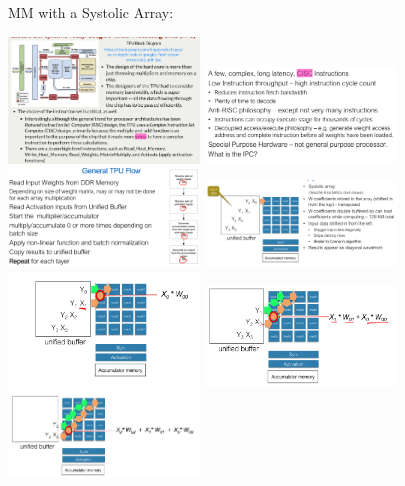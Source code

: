\documentclass[letter,8pt,landscape]{article}
\begin{document}
\begin{multicols}{3}
  MM with a Systolic Array:
  \begin{center}
    \includegraphics[width=2in]{images/tpu-block.jpg}
    \includegraphics[width=2in]{images/tpu-inst.jpg}
    \includegraphics[width=2in]{images/tpu-flow.jpg}
    \includegraphics[width=2in]{images/tpu1.jpg}
    \includegraphics[width=2in]{images/tpu2.jpg}
    \includegraphics[width=2in]{images/tpu3.jpg}
    \includegraphics[width=2in]{images/tpu4.jpg}

\end{center}
\end{multicols}
\end{document}

